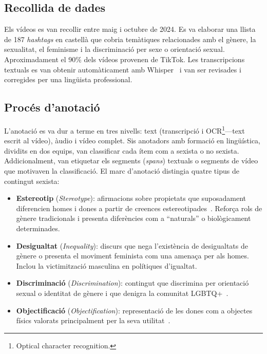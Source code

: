 \subsection{Recollida de dades}

Els vídeos es van recollir entre maig i octubre de 2024.
Es va elaborar una llista de 187 \textit{hashtags} en castellà que cobria temàtiques relacionades amb el gènere, la sexualitat, el feminisme i la discriminació per sexe o orientació sexual. 
Aproximadament el 90\% dels vídeos provenen de TikTok. 
Les transcripcions textuals es van obtenir automàticament amb Whisper~\cite{whisper} i van ser revisades i corregides per una lingüista professional.

\subsection{Procés d'anotació}

L'anotació es va dur a terme en tres nivells: text (transcripció i OCR\footnote{Optical character recognition.}---text escrit al vídeo), àudio i vídeo complet.
Sis anotadors amb formació en lingüística, dividits en dos equips, van classificar cada ítem com a sexista o no sexista.
Addicionalment, van etiquetar els segments (\textit{spans}) textuals o segments de vídeo que motivaven la classificació.
El marc d'anotació distingia quatre tipus de contingut sexista:
\begin{itemize}
    \item \textbf{Estereotip} (\textit{Stereotype}): afirmacions sobre propietats que suposadament diferencien homes i dones a partir de creences estereotipades~\cite{samory2021call}. Reforça rols de gènere tradicionals i presenta diferències com a ``naturals'' o biològicament determinades.
    \item \textbf{Desigualtat} (\textit{Inequality}): discurs que nega
    l'existència de desigualtats de gènere o presenta el moviment feminista com una amenaça per als homes. Inclou la victimització masculina en polítiques d'igualtat.
    \item \textbf{Discriminació} (\textit{Discrimination}): contingut que
    discrimina per orientació sexual o identitat de gènere i que denigra la comunitat LGBTQ+~\cite{chakravarthi2021dataset}.
    \item \textbf{Objectificació} (\textit{Objectification}): representació de les dones com a objectes físics valorats principalment per la seva utilitat~\cite{szymanski2011sexual}.
\end{itemize}

